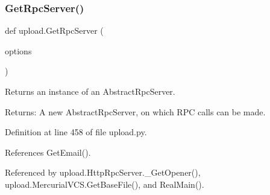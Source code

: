 \subsubsection{\texorpdfstring{Get\+Rpc\+Server()}{GetRpcServer()}}
{\footnotesize\ttfamily def upload.\+Get\+Rpc\+Server (\begin{DoxyParamCaption}\item[{}]{options }\end{DoxyParamCaption})}

\begin{DoxyVerb}Returns an instance of an AbstractRpcServer.

Returns:
  A new AbstractRpcServer, on which RPC calls can be made.
\end{DoxyVerb}
 

Definition at line 458 of file upload.\+py.



References Get\+Email().



Referenced by upload.\+Http\+Rpc\+Server.\+\_\+\+Get\+Opener(), upload.\+Mercurial\+V\+C\+S.\+Get\+Base\+File(), and Real\+Main().


